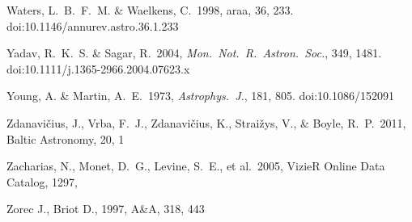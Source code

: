 \documentclass{jaa}
\def\apj{{\it Astrophys.~J.}}
\def\aj{{\it Astronom.~J.}}
\def\mnras{{\it Mon.~Not.~R.~Astron.~Soc.}}
\def\aap{{\it Astron.~Astrophys.}}
\begin{document}
\begin{thebibliography}{99}



 Waters, L.~B.~F.~M. \& Waelkens, C.\ 1998, araa, 36, 233. doi:10.1146/annurev.astro.36.1.233

 Yadav, R.~K.~S. \& Sagar, R.\ 2004, \mnras, 349, 1481. doi:10.1111/j.1365-2966.2004.07623.x

 Young, A. \& Martin, A.~E.\ 1973, \apj, 181, 805. doi:10.1086/152091

 Zdanavi{\v c}ius, J., Vrba, F.~J., Zdanavi{\v c}ius, K., Strai{\v z}ys, V., \& Boyle, R.~P.\ 2011, Baltic Astronomy, 20, 1

 Zacharias, N., Monet, D.~G., Levine, S.~E., et al.\ 2005, VizieR Online Data Catalog, 1297, %

 Zorec J., Briot D., 1997, A\&A, 318, 443

\end{thebibliography}
\end{document}
